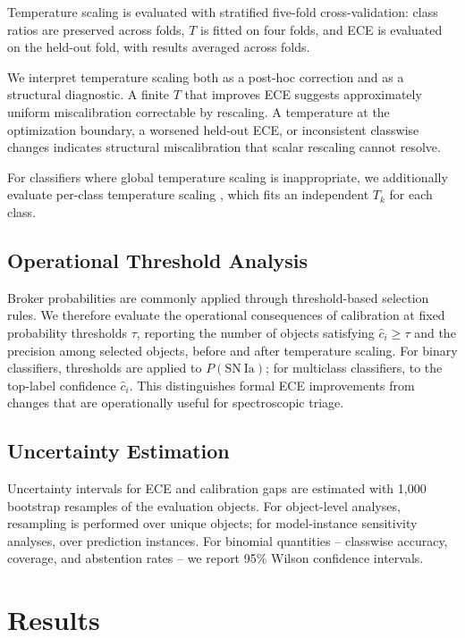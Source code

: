 \documentclass[a4paper,fleqn,usenatbib]{mnras}
\begin{document}
Temperature scaling is evaluated with stratified five-fold
cross-validation: class ratios are preserved across folds, $T$
is fitted on four folds, and ECE is evaluated on the held-out
fold, with results averaged across folds.

We interpret temperature scaling both as a post-hoc correction
and as a structural diagnostic. A finite $T$ that improves ECE
suggests approximately uniform miscalibration correctable by
rescaling. A temperature at the optimization boundary, a worsened
held-out ECE, or inconsistent classwise changes indicates
structural miscalibration that scalar rescaling cannot resolve.

For classifiers where global temperature scaling is inappropriate,
we additionally evaluate per-class temperature scaling
\citep{fang2020}, which fits an independent $T_k$ for each class.

\subsection{Operational Threshold Analysis}\label{sec:thresholds}

Broker probabilities are commonly applied through threshold-based
selection rules. We therefore evaluate the operational
consequences of calibration at fixed probability thresholds
$\tau$, reporting the number of objects satisfying $\hat{c}_i
\geq \tau$ and the precision among selected objects, before and
after temperature scaling. For binary classifiers, thresholds are
applied to $P(\mathrm{SN~Ia})$; for multiclass classifiers, to
the top-label confidence $\hat{c}_i$. This distinguishes formal
ECE improvements from changes that are operationally useful for
spectroscopic triage.

\subsection{Uncertainty Estimation}\label{sec:uncertainty}

Uncertainty intervals for ECE and calibration gaps are estimated
with 1{,}000 bootstrap resamples of the evaluation objects. For
object-level analyses, resampling is performed over unique
objects; for model-instance sensitivity analyses, over prediction
instances. For binomial quantities -- classwise accuracy, coverage,
and abstention rates -- we report 95\% Wilson confidence intervals.

\section{Results} \label{sec:results}
\end{document}
